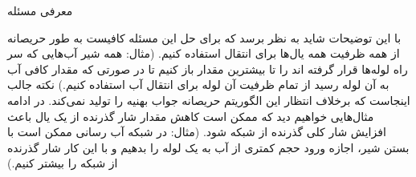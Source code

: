 \begin{itemframe}{معرفی مسئله}

\itm
با این توضیحات شاید به نظر برسد که برای حل این مسئله کافیست به طور حریصانه از همه ظرفیت همه یال‌ها برای انتقال استفاده کنیم. (مثال: همه شیر آب‌هایی که سر راه لوله‌ها قرار گرفته اند را تا بیشترین مقدار باز کنیم تا در صورتی که مقدار کافی آب به آن لوله رسید از تمام ظرفیت آن لوله برای انتقال آب استفاده کنیم.)
\itm
نکته جالب اینجاست که برخلاف انتظار این الگوریتم حریصانه جواب بهنیه را تولید نمی‌کند. در ادامه مثال‌هایی خواهیم دید که ممکن است کاهش مقدار شار گذرنده از یک یال باعث افزایش شار کلی گذرنده از شبکه شود. (مثال: در شبکه آب رسانی ممکن است با بستن شیر، اجازه ورود حجم کمتری از آب به یک لوله را بدهیم و با این کار شار گذرنده از شبکه را بیشتر کنیم.)
\end{itemframe}

